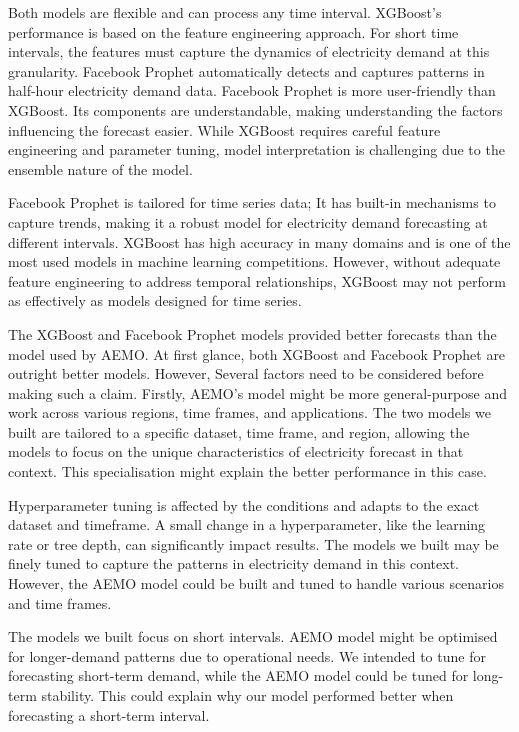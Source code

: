 \documentclass[mstat,12pt]{unswthesis}
\begin{document}
Both models are flexible and can process any time interval. XGBoost's
performance is based on the feature engineering approach. For short time
intervals, the features must capture the dynamics of electricity demand
at this granularity. Facebook Prophet automatically detects and captures
patterns in half-hour electricity demand data. Facebook Prophet is more
user-friendly than XGBoost. Its components are understandable, making
understanding the factors influencing the forecast easier. While XGBoost
requires careful feature engineering and parameter tuning, model
interpretation is challenging due to the ensemble nature of the model.

Facebook Prophet is tailored for time series data; It has built-in
mechanisms to capture trends, making it a robust model for electricity
demand forecasting at different intervals. XGBoost has high accuracy in
many domains and is one of the most used models in machine learning
competitions. However, without adequate feature engineering to address
temporal relationships, XGBoost may not perform as effectively as models
designed for time series.

The XGBoost and Facebook Prophet models provided better forecasts than
the model used by AEMO. At first glance, both XGBoost and Facebook
Prophet are outright better models. However, Several factors need to be
considered before making such a claim. Firstly, AEMO's model might be
more general-purpose and work across various regions, time frames, and
applications. The two models we built are tailored to a specific
dataset, time frame, and region, allowing the models to focus on the
unique characteristics of electricity forecast in that context. This
specialisation might explain the better performance in this case.

Hyperparameter tuning is affected by the conditions and adapts to the
exact dataset and timeframe. A small change in a hyperparameter, like
the learning rate or tree depth, can significantly impact results. The
models we built may be finely tuned to capture the patterns in
electricity demand in this context. However, the AEMO model could be
built and tuned to handle various scenarios and time frames.

The models we built focus on short intervals. AEMO model might be
optimised for longer-demand patterns due to operational needs. We
intended to tune for forecasting short-term demand, while the AEMO model
could be tuned for long-term stability. This could explain why our model
performed better when forecasting a short-term interval.
\end{document}
